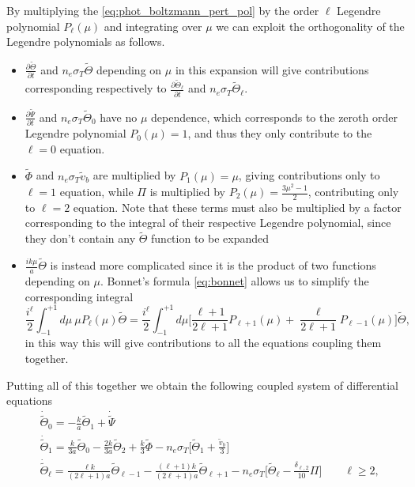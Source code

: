 By multiplying the \eqref{eq:phot_boltzmann_pert_pol} by the order $\ell$ Legendre polynomial $P_\ell(\mu)$ and integrating over $\mu$ we can exploit the orthogonality of the Legendre polynomials as follows.
\begin{itemize}
    \item $\frac{\partial \tilde\Theta}{\partial t} $ and $n_e\sigma_T\tilde{\Theta}$ depending on $\mu$ in this expansion will give contributions corresponding respectively to $\frac{\partial \tilde\Theta_\ell}{\partial t} $ and $n_e\sigma_T\tilde{\Theta}_\ell$.
    \item $\frac{\partial\tilde\Psi}{\partial t}$ and $n_e\sigma_T\tilde\Theta_0$ have no $\mu$ dependence, which corresponds to the zeroth order Legendre polynomial $P_0(\mu)=1$, and thus they only contribute to the $\ell=0$ equation.
    \item $\tilde\Phi$ and $n_e\sigma_T\tilde v_b$ are multiplied by $P_1(\mu)=\mu$, giving contributions only to $\ell=1$ equation, while $\Pi$ is multiplied by $P_2(\mu)=\frac{3\mu^2-1}{2}$, contributing only to $\ell=2$ equation. Note that these terms must also be multiplied by a factor corresponding to the integral of their respective Legendre polynomial, since they don't contain any $\tilde\Theta$ function to be expanded 
    \item $\frac{ik\mu}{a}\tilde\Theta$ is instead more complicated since it is the product of two functions depending on $\mu$. Bonnet's formula \eqref{eq:bonnet} allows us to simplify the corresponding integral 
    $$\frac{i^\ell}{2}\int_{-1}^{+1}d\mu\ \mu P_\ell(\mu)\tilde\Theta=\frac{i^\ell}{2}\int_{-1}^{+1}d\mu \bigg[\frac{\ell+1}{2\ell+1}P_{\ell+1}(\mu)+\frac{\ell}{2\ell+1}P_{\ell-1}(\mu)\bigg]\tilde\Theta,$$
    in this way this will give contributions to all the equations coupling them together.
\end{itemize}
Putting all of this together we obtain the following coupled system of differential equations
\begin{subequations}\label{eq:multipole_boltzmann_photons}
    \begin{align}
           &\dot{\tilde{\Theta}}_0=-\frac{k}{a}\tilde{\Theta}_1+\dot{\tilde\Psi}\label{eq:multipole_boltzmann_photons_0}\\
            &\dot{\tilde{\Theta}}_1=\frac{k}{3a}\tilde\Theta_0-\frac{2k}{3a}\tilde\Theta_2+\frac{k}{3}\tilde\Phi-n_e\sigma_T\bigg[\tilde\Theta_1+\frac{\tilde v_b}{3}\bigg]\label{eq:multipole_boltzmann_photons_2}\\
            &\dot{\tilde{\Theta}}_\ell=\frac{\ell k}{(2\ell+1)a}\tilde\Theta_{\ell-1}-\frac{(\ell+1)k}{(2\ell+1)a}\tilde\Theta_{\ell+1}-n_e\sigma_T\bigg[\tilde\Theta_\ell-\frac{\delta_{\ell,2}}{10}\Pi\bigg]\qquad \ell\geq 2,\label{eq:multipole_boltzmann_photons_3}
        \end{align}
\end{subequations}

